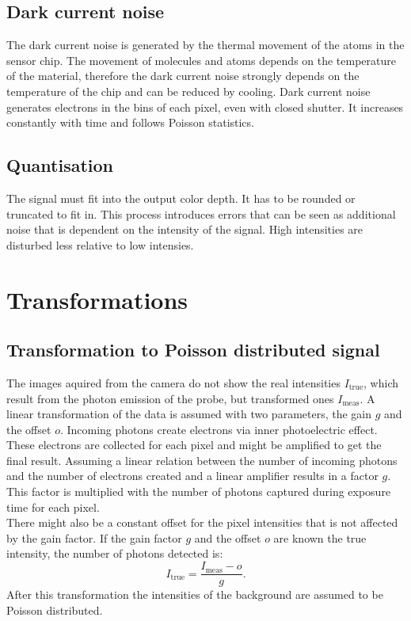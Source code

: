 \subsection{Dark current noise}
The dark current noise is generated by the thermal movement of the atoms in the sensor chip. The movement of molecules and atoms depends on the temperature of the material, therefore the dark current noise strongly depends on the temperature of the chip and can be reduced by cooling. Dark current noise generates electrons in the bins of each pixel, even with closed shutter. It increases constantly with time and follows Poisson statistics.
\subsection{Quantisation}
The signal must fit into the output color depth. It has to be rounded or truncated to fit in. This process introduces errors that can be seen as additional noise that is dependent on the intensity of the signal. High intensities are disturbed less relative to low intensies.


\section{Transformations}
\subsection{Transformation to Poisson distributed signal} \label{trafoPoiss}
The images aquired from the camera do not show the real intensities
$I_\text{true}$, which result from the photon emission of the probe, but
transformed ones $I_\text{meas}$.\newline
A linear transformation of the data is assumed with two parameters, the gain $g$ and the offset $o$.
Incoming photons create electrons via inner photoelectric effect. These electrons
are collected for each pixel and might be amplified to get the final result.
Assuming a linear relation between the number of incoming photons and the number
of electrons created and a linear amplifier results in a factor $g$. This factor
is multiplied with the number of photons captured during exposure time for each
pixel.\\
There might also be a constant offset for the pixel intensities that is not affected by the gain factor.
If the gain factor $g$ and the offset $o$ are known the true intensity, the
number of photons detected is:
\begin{equation}
	I_\text{true} = \dfrac{I_\text{meas}-o}{g}. \label{transtopoiss}
\end{equation}
After this transformation the intensities of the background are assumed to be Poisson distributed.

